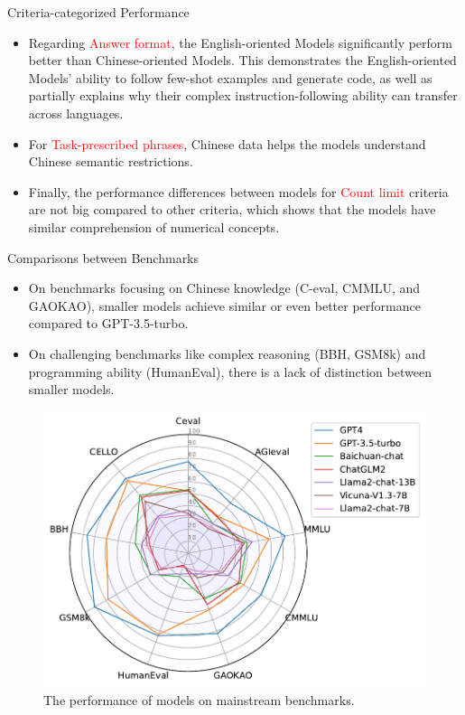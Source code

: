 \documentclass{beamer}
\begin{document}
\begin{frame}{Criteria-categorized Performance}
    \begin{itemize}
        \item {Regarding \textcolor{red}{Answer format}, the English-oriented Models significantly perform better than Chinese-oriented Models. This demonstrates the English-oriented Models' ability to follow few-shot examples and generate code, as well as partially explains why their complex instruction-following ability can transfer across languages.}
        \item {For \textcolor{red}{Task-prescribed phrases}, Chinese data helps the models understand Chinese semantic restrictions.}
        \item {Finally, the performance differences between models for \textcolor{red}{Count limit} criteria are not big compared to other criteria, which shows that the models have similar comprehension of numerical concepts.}
    \end{itemize}
\end{frame}

\begin{frame}{Comparisons between Benchmarks}
    \begin{itemize}
        \item {On benchmarks focusing on Chinese knowledge (C-eval, CMMLU, and GAOKAO), smaller models achieve similar or even better performance compared to GPT-3.5-turbo.}
        \item {On challenging benchmarks like complex reasoning (BBH, GSM8k) and programming ability (HumanEval), there is a lack of distinction between smaller models.}
    \end{itemize}
    \begin{figure}[h]
        \centering
        \includegraphics[height=.42\textheight]{./images/figures/discrim.pdf}
        \caption{The performance of models on mainstream benchmarks.}
    \end{figure}
\end{frame}
\end{document}
